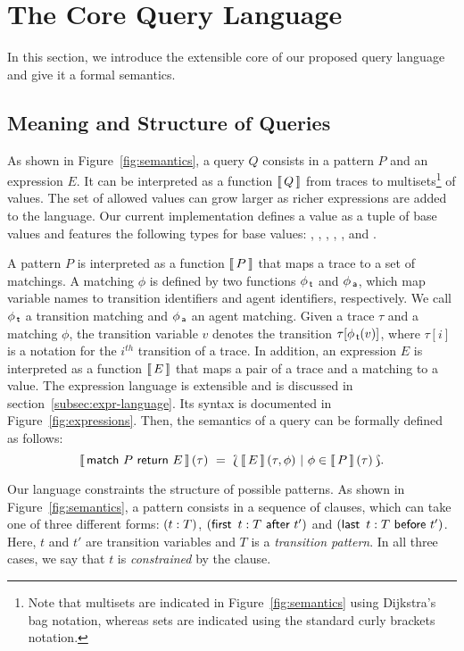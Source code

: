 \documentclass[runningheads]{llncs}
\begin{document}

\section{The Core Query Language}\label{sec:semantics}

In this section, we introduce the extensible core of our proposed
query language and give it a formal semantics.

\subsection{Meaning and Structure of Queries}\label{subsec:structure}
As shown in Figure~\ref{fig:semantics}, a query $Q$ consists in a
pattern $P$ and an expression $E$. It can be interpreted as a function
$\left\llbracket \, Q \, \right\rrbracket$ from traces to multisets\footnote{Note that multisets are
  indicated in Figure~\ref{fig:semantics} using Dijkstra's bag
  notation, whereas sets are indicated using the standard curly
  brackets notation.} of values. The set of allowed values can grow
larger as richer expressions are added to the language. Our current
implementation defines a value as a tuple of base values and features
the following types for base values: , , ,
, ,  and .

A pattern $P$ is interpreted as a function $\left\llbracket \, P \, \right\rrbracket$ that maps a trace
to a set of matchings. A matching $\phi$ is defined by two functions
$\phi_{\,\textsf{t}}$ and $\phi_{\,\textsf{a}}$, which map variable names to transition
identifiers and agent identifiers, respectively. We call $\phi_{\,\textsf{t}}$
a transition matching and $\phi_{\,\textsf{a}}$ an agent matching.  Given a
trace $\tau$ and a matching $\phi$, the transition variable $v$
denotes the transition $\tau[\phi_{\,\textsf{t}}(v)]$, where $\tau[i]$ is a
notation for the $i^{th}$ transition of a trace. In addition, an
expression $E$ is interpreted as a function $\left\llbracket \, E \, \right\rrbracket$ that maps a pair
of a trace and a matching to a value. The expression language is
extensible and is discussed in section~\ref{subsec:expr-language}. Its
syntax is documented in Figure~\ref{fig:expressions}. Then, the
semantics of a query can be formally defined as follows:
\[ \Sem{\MatchRet{\TracePat}{E}}(\tau) \ = \ \BagC{\Sem{E}(\tau,
    \phi)}{\phi \in \Sem{\TracePat}(\tau) }.  \]

Our language constraints the structure of possible patterns.
As shown in Figure~\ref{fig:semantics}, a pattern consists in a
sequence of clauses, which can take one of three different forms:
$(t:T)$, $(\textsf{first} \,\ t:T \ \textsf{after} \ t')$ and
$(\textsf{last} \,\ t:T \ \textsf{before} \ t')$. Here, $t$ and $t'$ are transition
variables and $T$ is a \emph{transition pattern}. In all three cases,
we say that $t$ is \emph{constrained} by the clause.
\end{document}
